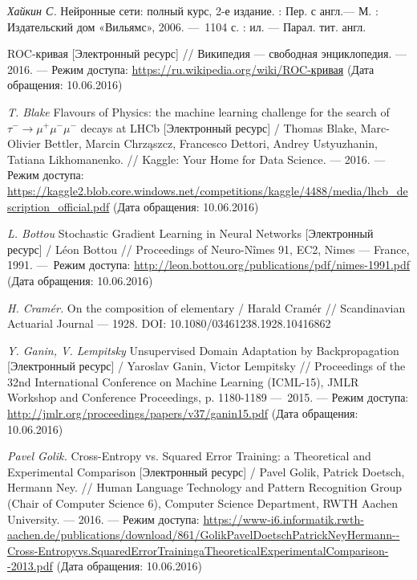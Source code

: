 \documentclass[14pt, a4paper]{extarticle}
\begin{document}
\begin{thebibliography}{3}  

\textit{Хайкин С.} Нейронные сети: полный курс, 2-е издание. : Пер. с англ.— М. : Издательский дом «Вильямс», 2006. — 1104 с. : ил. — Парал. тит. англ.

ROC-кривая [Электронный ресурс] // Википедия — свободная энциклопедия. — 2016. — Режим доступа: \url{https://ru.wikipedia.org/wiki/ROC-кривая} (Дата обращения: 10.06.2016)

\textit{T. Blake} Flavours of Physics: the machine learning challenge for the search of $\tau^-\rightarrow\mu^+ \mu^- \mu^-$ decays at LHCb [Электронный ресурс] / Thomas Blake, Marc-Olivier Bettler, Marcin Chrząszcz, Francesco Dettori, Andrey Ustyuzhanin, Tatiana Likhomanenko. // Kaggle: Your Home for Data Science. — 2016. — Режим доступа: 
	\url{https://kaggle2.blob.core.windows.net/competitions/kaggle/4488/media/lhcb_description_official.pdf} (Дата обращения: 10.06.2016)

\textit{L. Bottou} Stochastic Gradient Learning in Neural Networks [Электронный ресурс] / Léon Bottou // Proceedings of Neuro-Nîmes 91, EC2, Nimes — France, 1991. — Режим доступа: \url{http://leon.bottou.org/publications/pdf/nimes-1991.pdf} (Дата обращения: 10.06.2016)

\textit{H. Cram\'er.} On the composition of elementary / Harald Cramér // Scandinavian Actuarial Journal — 1928. DOI: 10.1080/03461238.1928.10416862 %

\textit{Y. Ganin, V. Lempitsky} Unsupervised Domain Adaptation by Backpropagation [Электронный ресурс] / Yaroslav Ganin, Victor Lempitsky // Proceedings of the 32nd International Conference on Machine Learning (ICML-15), JMLR Workshop and Conference Proceedings, p. 1180-1189 — 2015. — Режим доступа: \url{http://jmlr.org/proceedings/papers/v37/ganin15.pdf} (Дата обращения: 10.06.2016)

\textit{Pavel Golik.} Cross-Entropy vs. Squared Error Training: a Theoretical and Experimental Comparison [Электронный ресурс] / Pavel Golik, Patrick Doetsch, Hermann Ney. // Human Language Technology and Pattern Recognition Group (Chair of Computer Science 6), Computer Science Department, RWTH Aachen University. — 2016. — Режим доступа: \url{https://www-i6.informatik.rwth-aachen.de/publications/download/861/GolikPavelDoetschPatrickNeyHermann--Cross-Entropyvs.SquaredErrorTrainingaTheoreticalExperimentalComparison--2013.pdf} (Дата обращения: 10.06.2016)


\end{thebibliography}
\end{document}

